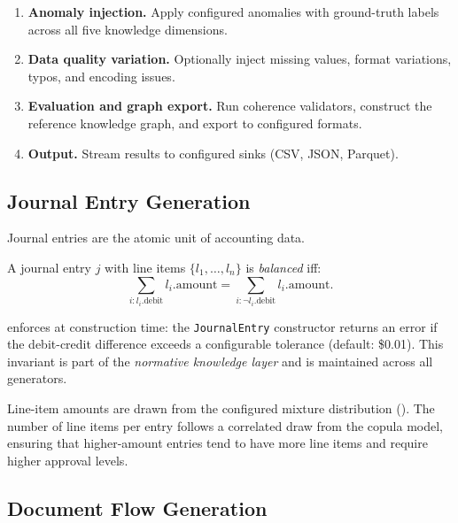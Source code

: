 \begin{enumerate}
  \item \textbf{Anomaly injection.}  Apply configured anomalies with
    ground-truth labels across all five knowledge dimensions.

  \item \textbf{Data quality variation.}  Optionally inject missing
    values, format variations, typos, and encoding issues.

  \item \textbf{Evaluation and graph export.}  Run coherence validators,
    construct the reference knowledge graph, and export to configured
    formats.

  \item \textbf{Output.}  Stream results to configured sinks (CSV, JSON,
    Parquet).
\end{enumerate}

\subsection{Journal Entry Generation}
\label{sec:gen_journal}

Journal entries are the atomic unit of accounting data.

\begin{definition}
A journal entry $j$ with line items $\{l_1, \ldots, l_n\}$ is
\emph{balanced} iff:
\begin{equation}
\sum_{i : l_i.\text{debit}} l_i.\text{amount}
  = \sum_{i : \neg l_i.\text{debit}} l_i.\text{amount}.
\label{eq:balanced}
\end{equation}
\end{definition}

\system{} enforces  at construction time: the
\texttt{JournalEntry} constructor returns an error if the debit-credit
difference exceeds a configurable tolerance (default: \$0.01).  This
invariant is part of the \emph{normative knowledge layer} and is
maintained across all generators.

Line-item amounts are drawn from the configured mixture distribution
().  The number of line items per entry
follows a correlated draw from the copula model, ensuring that
higher-amount entries tend to have more line items and require higher
approval levels.

\subsection{Document Flow Generation}
\label{sec:gen_docflow}

